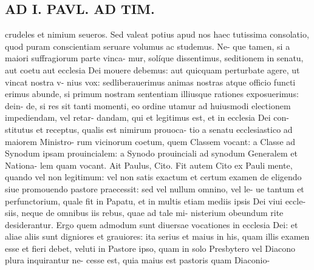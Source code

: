 \documentclass{article}
\begin{document}
\begin{pages}
\section*{AD I. PAVL. AD TIM. }
\marginpar{[ p.340 ]}crudeles et nimium seueros. Sed valeat potius apud nos haec tutissima consolatio, quod puram conscientiam seruare volumus ac studemus. Ne- que tamen, si a maiori suffragiorum parte vinca- mur, solíque dissentimus, seditionem in senatu, aut coetu aut ecclesia Dei mouere debemus: aut quicquam perturbate agere, ut vincat nostra v- nius vox: sedliberauerimus animas nostras atque officio functi erimus abunde, si primum nostram sententiam illiusque rationes exposuerimus: dein- de, si res sit tanti momenti, eo ordine utamur ad huiusmodi electionem impediendam, vel retar- dandam, qui et legitimus est, et in ecclesia Dei con- stitutus et receptus, qualis est nimirum prouoca- tio a senatu ecclesiastico ad maiorem Ministro- rum vicinorum coetum, quem Classem vocant: a Classe ad Synodum ipsam prouincialem: a Synodo prouinciali ad synodum Generalem et Nationa- lem quam vocant. Ait Paulus, Cito. Fit autem Cito ex Pauli mente, quando vel non legitimum: vel non satis exactum et certum examen de eligendo siue promouendo pastore praecessit: sed vel nullum omnino, vel le- ue tantum et perfunctorium, quale fit in Papatu, et in multis etiam mediis ipsis Dei viui eccle- siis, neque de omnibus iis rebus, quae ad tale mi- nisterium obeundum rite desiderantur. Ergo quem admodum sunt diuersae vocationes in ecclesia Dei: et aliae aliis sunt digniores et grauiores: ita serius et maius in his, quam illis examen esse et fieri debet, veluti in Pastore ipso, quam in solo Presbytero vel Diacono plura inquirantur ne- cesse est, quia maius est pastoris quam Diaconio- 

\end{pages}
\end{document}
